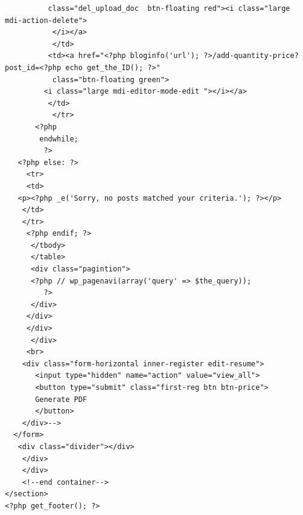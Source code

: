 \documentclass[a4paper,12pt]{article}
\begin{document}
\begin{verbatim}
          class="del_upload_doc  btn-floating red"><i class="large mdi-action-delete">
           </i></a>
           </td>
          <td><a href="<?php bloginfo('url'); ?>/add-quantity-price?post_id=<?php echo get_the_ID(); ?>"
           class="btn-floating green">
         <i class="large mdi-editor-mode-edit "></i></a>
          </td>
           </tr>
       <?php
        endwhile;
         ?>
   <?php else: ?>
     <tr>
     <td>                
   <p><?php _e('Sorry, no posts matched your criteria.'); ?></p>
    </td>
    </tr>
     <?php endif; ?>
      </tbody>
      </table>
      <div class="pagintion">
      <?php // wp_pagenavi(array('query' => $the_query));
         ?>
      </div>
     </div>
     </div>
      </div> 
     <br>
    <div class="form-horizontal inner-register edit-resume">
       <input type="hidden" name="action" value="view_all">
       <button type="submit" class="first-reg btn btn-price">
       Generate PDF
       </button>
    </div>-->
  </form>
   <div class="divider"></div> 
    </div>
    </div>
    <!--end container-->
</section>
<?php get_footer(); ?>
\end{verbatim}
\end{document}
